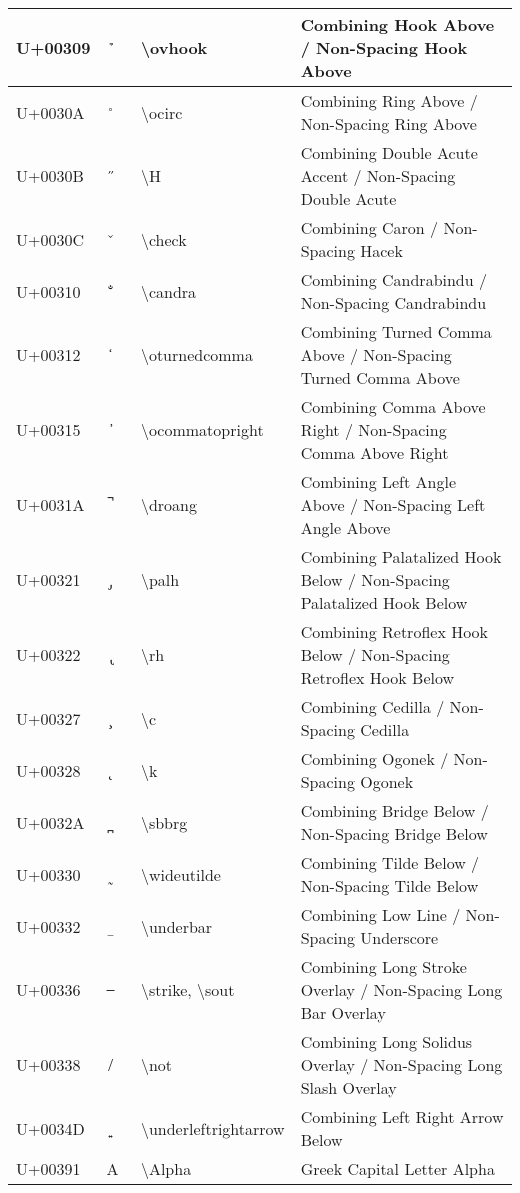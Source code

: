 \begin{table}[h]
\begin{tabulary}{\linewidth}{|L|L|L|L|}
U+00309 &  ̉  & {\textbackslash}ovhook & Combining Hook Above / Non-Spacing Hook Above \\
\hline
U+0030A &  ̊  & {\textbackslash}ocirc & Combining Ring Above / Non-Spacing Ring Above \\
\hline
U+0030B &  ̋  & {\textbackslash}H & Combining Double Acute Accent / Non-Spacing Double Acute \\
\hline
U+0030C &  ̌  & {\textbackslash}check & Combining Caron / Non-Spacing Hacek \\
\hline
U+00310 &  ̐  & {\textbackslash}candra & Combining Candrabindu / Non-Spacing Candrabindu \\
\hline
U+00312 &  ̒  & {\textbackslash}oturnedcomma & Combining Turned Comma Above / Non-Spacing Turned Comma Above \\
\hline
U+00315 &  ̕  & {\textbackslash}ocommatopright & Combining Comma Above Right / Non-Spacing Comma Above Right \\
\hline
U+0031A &  ̚  & {\textbackslash}droang & Combining Left Angle Above / Non-Spacing Left Angle Above \\
\hline
U+00321 &  ̡  & {\textbackslash}palh & Combining Palatalized Hook Below / Non-Spacing Palatalized Hook Below \\
\hline
U+00322 &  ̢  & {\textbackslash}rh & Combining Retroflex Hook Below / Non-Spacing Retroflex Hook Below \\
\hline
U+00327 &  ̧  & {\textbackslash}c & Combining Cedilla / Non-Spacing Cedilla \\
\hline
U+00328 &  ̨  & {\textbackslash}k & Combining Ogonek / Non-Spacing Ogonek \\
\hline
U+0032A &  ̪  & {\textbackslash}sbbrg & Combining Bridge Below / Non-Spacing Bridge Below \\
\hline
U+00330 &  ̰  & {\textbackslash}wideutilde & Combining Tilde Below / Non-Spacing Tilde Below \\
\hline
U+00332 &  ̲  & {\textbackslash}underbar & Combining Low Line / Non-Spacing Underscore \\
\hline
U+00336 &  ̶  & {\textbackslash}strike, {\textbackslash}sout & Combining Long Stroke Overlay / Non-Spacing Long Bar Overlay \\
\hline
U+00338 &  ̸  & {\textbackslash}not & Combining Long Solidus Overlay / Non-Spacing Long Slash Overlay \\
\hline
U+0034D &  ͍  & {\textbackslash}underleftrightarrow & Combining Left Right Arrow Below \\
\hline
U+00391 & Α & {\textbackslash}Alpha & Greek Capital Letter Alpha \\

\end{tabulary}
\end{table}

